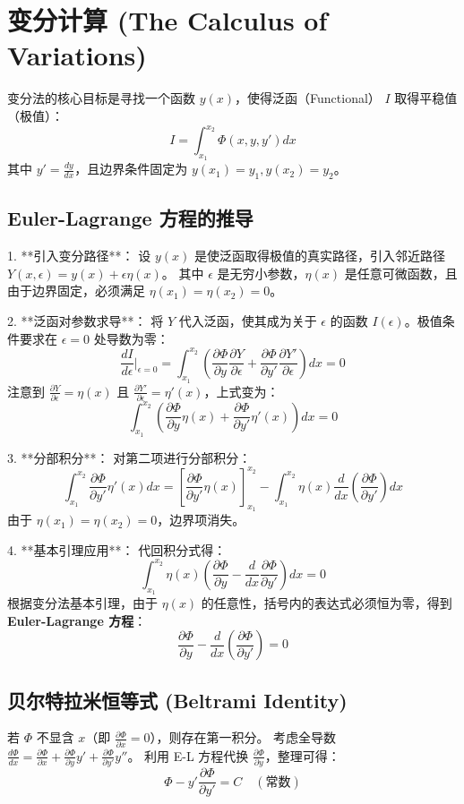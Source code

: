 \documentclass[11pt,a4paper]{article}
\begin{document}
\section{变分计算 (The Calculus of Variations)}

变分法的核心目标是寻找一个函数 $y(x)$，使得泛函（Functional） $I$ 取得平稳值（极值）：
\[ I = \int_{x_1}^{x_2} \Phi(x, y, y') dx \]
其中 $y' = \frac{dy}{dx}$，且边界条件固定为 $y(x_1) = y_1, y(x_2) = y_2$。

\subsection{Euler-Lagrange 方程的推导}

1. **引入变分路径**：
   设 $y(x)$ 是使泛函取得极值的真实路径，引入邻近路径 $Y(x, \epsilon) = y(x) + \epsilon \eta(x)$。
   其中 $\epsilon$ 是无穷小参数，$\eta(x)$ 是任意可微函数，且由于边界固定，必须满足 $\eta(x_1) = \eta(x_2) = 0$。

2. **泛函对参数求导**：
   将 $Y$ 代入泛函，使其成为关于 $\epsilon$ 的函数 $I(\epsilon)$。极值条件要求在 $\epsilon = 0$ 处导数为零：
   \[ \frac{dI}{d\epsilon}\bigg|_{\epsilon=0} = \int_{x_1}^{x_2} \left( \frac{\partial \Phi}{\partial y} \frac{\partial Y}{\partial \epsilon} + \frac{\partial \Phi}{\partial y'} \frac{\partial Y'}{\partial \epsilon} \right) dx = 0 \]
   注意到 $\frac{\partial Y}{\partial \epsilon} = \eta(x)$ 且 $\frac{\partial Y'}{\partial \epsilon} = \eta'(x)$，上式变为：
   \[ \int_{x_1}^{x_2} \left( \frac{\partial \Phi}{\partial y} \eta(x) + \frac{\partial \Phi}{\partial y'} \eta'(x) \right) dx = 0 \]

3. **分部积分**：
   对第二项进行分部积分：
   \[ \int_{x_1}^{x_2} \frac{\partial \Phi}{\partial y'} \eta'(x) dx = \left[ \frac{\partial \Phi}{\partial y'} \eta(x) \right]_{x_1}^{x_2} - \int_{x_1}^{x_2} \eta(x) \frac{d}{dx} \left( \frac{\partial \Phi}{\partial y'} \right) dx \]
   由于 $\eta(x_1) = \eta(x_2) = 0$，边界项消失。

4. **基本引理应用**：
   代回积分式得：
   \[ \int_{x_1}^{x_2} \eta(x) \left( \frac{\partial \Phi}{\partial y} - \frac{d}{dx} \frac{\partial \Phi}{\partial y'} \right) dx = 0 \]
   根据变分法基本引理，由于 $\eta(x)$ 的任意性，括号内的表达式必须恒为零，得到 \textbf{Euler-Lagrange 方程}：
   \[ \boxed{\frac{\partial \Phi}{\partial y} - \frac{d}{dx} \left( \frac{\partial \Phi}{\partial y'} \right) = 0} \]

\subsection{贝尔特拉米恒等式 (Beltrami Identity)}
若 $\Phi$ 不显含 $x$（即 $\frac{\partial \Phi}{\partial x} = 0$），则存在第一积分。
考虑全导数 $\frac{d\Phi}{dx} = \frac{\partial \Phi}{\partial x} + \frac{\partial \Phi}{\partial y}y' + \frac{\partial \Phi}{\partial y'}y''$。
利用 E-L 方程代换 $\frac{\partial \Phi}{\partial y}$，整理可得：
\[ \boxed{\Phi - y' \frac{\partial \Phi}{\partial y'} = C \quad (\text{常数})} \]
\end{document}

